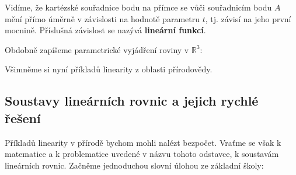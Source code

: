       

    Vidíme, že kartézské souřadnice bodu na přímce se vůči souřadnicím bodu \(A\) mění přímo 
    úměrně v závislosti na hodnotě parametru \(t\), tj. závisí na jeho první mocnině. Příslušná 
    závislost se nazývá \textbf{lineární funkcí}.

    Obdobně zapíšeme parametrické vyjádření roviny v \(\mathbb{R}^3\):
    
    

    Všimněme si nyní příkladů linearity z oblasti přírodovědy.
    
    

    
    
    \subsection{Soustavy lineárních rovnic a jejich rychlé řešení}\label{mai:IchapIIsecIssecI}
      Příkladů linearity v přírodě bychom mohli nalézt bezpočet. Vraťme se však k matematice a k
      problematice uvedené v názvu tohoto odstavce, k soustavám lineárních rovnic. Začněme
      jednoduchou slovní úlohou ze základní školy:
      
      
      
